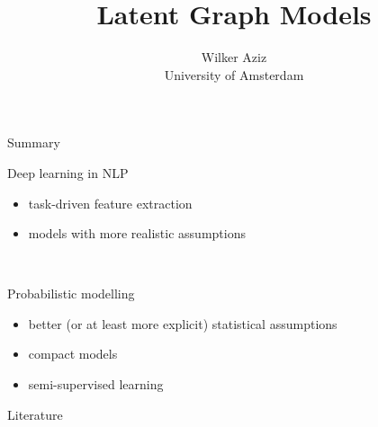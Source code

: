 \documentclass[usenames,dvipsnames]{beamer}
\title[DGMs in NLP]{Latent Graph Models}
\author[Wilker Aziz]{Wilker Aziz\\University of Amsterdam}
\begin{document}
\maketitlepage


\setcounter{framenumber}{0}


%

\begin{frame}{Summary}

Deep learning in NLP
\begin{itemize}
	\item task-driven feature extraction
	\item models with more realistic assumptions
\end{itemize}

~

Probabilistic modelling 
\begin{itemize}
	\item better (or at least more explicit) statistical assumptions
	\item compact models
	\item semi-supervised learning
\end{itemize}


\end{frame}

\begin{frame}[allowframebreaks]{Literature}

\small

\end{frame}
\end{document}
